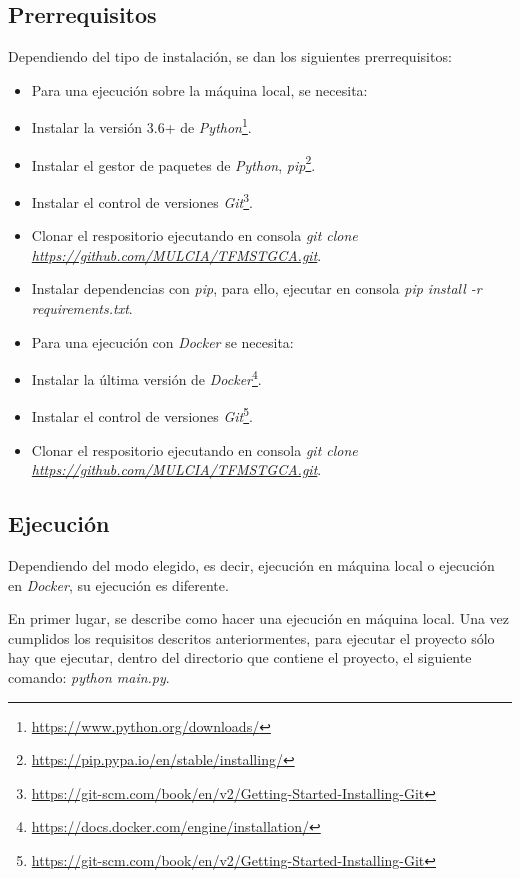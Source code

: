 \subsection{Prerrequisitos}

Dependiendo del tipo de instalación, se dan los siguientes prerrequisitos:

\begin{itemize}
  \item Para una ejecución sobre la máquina local, se necesita:
        \item Instalar la versión 3.6+ de \textit{Python}\footnote{\url{https://www.python.org/downloads/}}.
        \item Instalar el gestor de paquetes de \textit{Python}, \textit{pip}\footnote{\url{https://pip.pypa.io/en/stable/installing/}}.
        \item Instalar el control de versiones \textit{Git}\footnote{\url{https://git-scm.com/book/en/v2/Getting-Started-Installing-Git}}.
        \item Clonar el respositorio ejecutando en consola \textit{git clone \url{https://github.com/MULCIA/TFMSTGCA.git}}.
        \item Instalar dependencias con \textit{pip}, para ello, ejecutar en consola \textit{pip install -r requirements.txt}.
  \item Para una ejecución con \textit{Docker} se necesita:
        \item Instalar la última versión de \textit{Docker}\footnote{\url{https://docs.docker.com/engine/installation/}}.
        \item Instalar el control de versiones \textit{Git}\footnote{\url{https://git-scm.com/book/en/v2/Getting-Started-Installing-Git}}.
        \item Clonar el respositorio ejecutando en consola \textit{git clone \url{https://github.com/MULCIA/TFMSTGCA.git}}.
\end{itemize}

\subsection{Ejecución}

Dependiendo del modo elegido, es decir, ejecución en máquina local o ejecución en \textit{Docker}, su ejecución es diferente.

En primer lugar, se describe como hacer una ejecución en máquina local. Una vez cumplidos los requisitos descritos anteriormentes,
para ejecutar el proyecto sólo hay que ejecutar, dentro del directorio que contiene el proyecto, el siguiente comando:
\textit{python main.py}.

